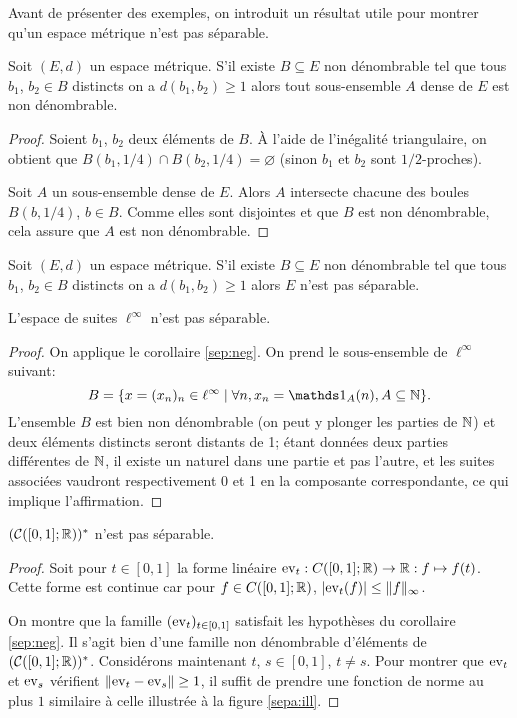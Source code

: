 Avant de présenter des exemples, on introduit un résultat utile pour montrer
qu'un espace métrique n'est pas séparable.

\begin{prop}
  Soit $(E, d)$ un espace métrique. S'il existe $B\subseteq E$ non dénombrable
  tel que tous $b_1$, $b_2\in B$ distincts on a $d(b_1, b_2)\geq 1$ alors
  tout sous-ensemble $A$ dense de $E$ est non dénombrable.
\end{prop}
\begin{proof}
  Soient $b_1$, $b_2$ deux éléments de $B$. \`A l'aide de l'inégalité
  triangulaire, on obtient que $B(b_1, 1/4)\cap B(b_2, 1/4)=\varnothing$
  (sinon $b_1$ et $b_2$ sont $1/2$-proches).

  Soit $A$ un sous-ensemble dense de $E$. Alors $A$ intersecte chacune des
  boules $B(b, 1/4)$, $b\in B$. Comme elles sont disjointes et que
  $B$ est non dénombrable, cela assure que $A$ est non dénombrable.
\end{proof}

\begin{cor}\label{sep:neg}
  Soit $(E, d)$ un espace métrique. S'il existe $B\subseteq E$ non dénombrable
  tel que tous $b_1$, $b_2\in B$ distincts on a $d(b_1, b_2)\geq 1$ alors
  $E$ n'est pas séparable.
\end{cor}

\begin{ex}
  L'espace de suites $\ell^\infty$ n'est pas séparable.
\end{ex}
\begin{proof}
  On applique le corollaire \ref{sep:neg}. On prend le sous-ensemble
  de $\ell^\infty$ suivant:
  $$B = \{x = (x_n)_n\in\ell^\infty\mid
  \forall n, x_n= \ind_A(n), A\subseteq \IN\}.$$
  L'ensemble $B$ est bien non dénombrable (on peut y plonger les parties
  de $\mathbb{N}$) et deux éléments distincts seront distants de 1; étant données
  deux parties différentes de $\mathbb{N}$, il existe un naturel dans une partie
  et pas l'autre, et les suites associées vaudront respectivement 0 et 1
  en la composante correspondante, ce qui implique l'affirmation.
\end{proof}

\begin{ex}
  $(\mathcal C([0, 1]; \mathbb{R}))^*$ n'est pas séparable.
\end{ex}
\begin{proof}
  Soit pour $t\in [0, 1]$ la forme linéaire $\mathrm{ev}_{t}: C([0, 1]; \mathbb{R}) \to \mathbb{R}:
  f\mapsto f(t)$. Cette forme est continue car pour $f\in C([0, 1]; \mathbb{R})$,
  $|\mathrm{ev}_t(f)|\leq \|f\|_\infty$.

  On montre que la famille $(\mathrm{ev}_t)_{t\in[0, 1]}$ satisfait les hypothèses
  du corollaire \ref{sep:neg}. Il s'agit bien d'une famille non dénombrable
  d'éléments de $(\mathcal C([0, 1]; \mathbb{R}))^*$. Considérons maintenant $t$, $s
  \in[0, 1]$, $t\neq s$. Pour montrer que $\mathrm{ev}_t$ et $\mathrm{ev}_s$ vérifient
  $\|\mathrm{ev}_t-\mathrm{ev}_s\|\geq 1$, il suffit de prendre une fonction de norme au
  plus $1$ similaire à celle illustrée à la figure \ref{sepa:ill}.
  
\end{proof}

